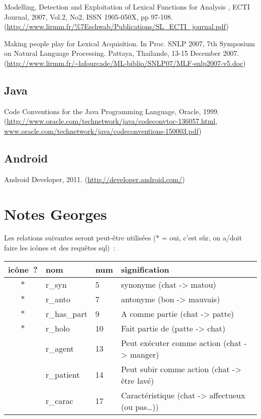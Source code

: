 \documentclass[a4paper,11pt,french]{article}
\begin{document}
Modelling, Detection and Exploitation of Lexical Functions for Analysis , ECTI Journal, 2007, Vol.2, No2, ISSN 1905-050X, pp 97-108. (\url{http://www.lirmm.fr/\%7Eschwab/Publications/SL_ECTI_journal.pdf})

Making people play for Lexical Acquisition. In Proc. SNLP 2007, 7th Symposium on Natural Language Processing. Pattaya, Thailande, 13-15 December 2007. (\url{http://www.lirmm.fr/~lafourcade/ML-biblio/SNLP07/MLF-snlp2007-v5.doc})


\subsection{Java}

Code Conventions for the Java Programming Language, Oracle, 1999. (\url{http://www.oracle.com/technetwork/java/codeconvtoc-136057.html, www.oracle.com/technetwork/java/codeconventions-150003.pdf})

\subsection{Android}

Android Developer, 2011. (\url{http://developer.android.com/})




\section{Notes Georges}
Les relations suivantes seront peut-être utilisées (* = oui, c'est sûr, on a/doit faire les icônes et des requêtes sql)~:

\begin{tabular}{|c|l|l|l|}
\hline
icône~? & nom & num & signification \\
\hline
$*$ & r\_syn       & 5  & synonyme (chat -> matou) \\
$*$ & r\_anto      & 7  & antonyme (bon -> mauvais) \\
$*$ & r\_has\_part & 9  & A comme partie (chat -> patte) \\
$*$ & r\_holo      & 10 & Fait partie de (patte -> chat) \\
    & r\_agent     & 13 & Peut exécuter comme action (chat -> manger) \\
    & r\_patient   & 14 & Peut subir comme action (chat -> être lavé) \\
    & r\_carac     & 17 & Caractéristique (chat -> affectueux (ou pas…)) \\
\hline
\end{tabular}
\newpage
\end{document}
